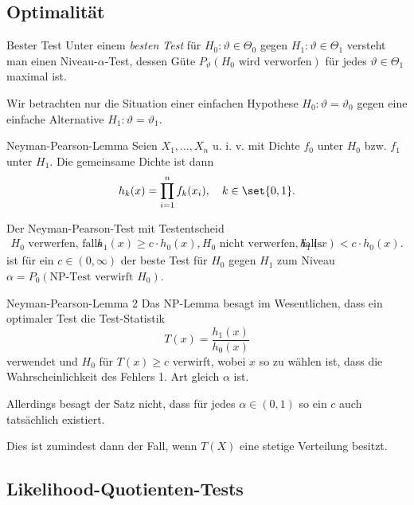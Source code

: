 \subsection{Optimalität}

\begin{karte}{Bester Test}
Unter einem \textit{besten Test} für \(H_0: \vartheta \in \Theta_0\) gegen \(H_1: \vartheta \in \Theta_1\) 
versteht man einen Niveau-\(\alpha\)-Test, dessen Güte \(P_\vartheta(H_0 \text{ wird verworfen})\) für jedes \(\vartheta \in \Theta_1\) 
maximal ist.

Wir betrachten nur die Situation einer einfachen Hypothese \(H_0: \vartheta = \vartheta_0\) gegen 
eine einfache Alternative \(H_1: \vartheta = \vartheta_1\).
\end{karte}

\begin{karte}{Neyman-Pearson-Lemma}
Seien \(X_1, \ldots, X_n\) u. i. v. mit Dichte \(f_0\) unter \(H_0\) bzw. \(f_1\) unter \(H_1\). 
Die gemeinsame Dichte ist dann 
\[ h_k(x) = \prod_{i=1}^n f_k(x_i), \quad k \in \set{0,1}. \]

Der Neyman-Pearson-Test mit Testentscheid
\begin{align*}
    H_0 \text{ verwerfen, falls} & h_1(x) \geq c \cdot h_0(x), 
    H_0 \text{ nicht verwerfen, falls} & h_1(x) < c \cdot h_0(x).
\end{align*}
ist für ein \(c \in (0,\infty)\) der beste Test für \(H_0\) gegen \(H_1\) zum Niveau \\
\(\alpha = P_0(\text{NP-Test verwirft } H_0)\).
\end{karte}

\begin{karte}{Neyman-Pearson-Lemma 2}
Das NP-Lemma besagt im Wesentlichen, dass ein optimaler Test die Test-Statistik 
\[ T(x) = \frac{h_1(x)}{h_0(x)} \]
verwendet und \(H_0\) für \(T(x) \geq c\) verwirft, wobei \(x\) so zu wählen ist, dass 
die Wahrscheinlichkeit des Fehlers 1. Art gleich \(\alpha\) ist. 

Allerdings besagt der Satz nicht, dass für jedes \(\alpha \in (0,1)\) so ein \(c\) 
auch tatsächlich existiert.

Dies ist zumindest dann der Fall, wenn \(T(X)\) eine stetige Verteilung besitzt.
\end{karte}

\subsection{Likelihood-Quotienten-Tests}

